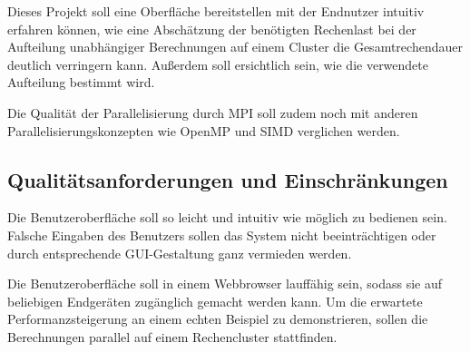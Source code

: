 Dieses Projekt soll eine Oberfläche bereitstellen mit der Endnutzer intuitiv erfahren können, wie
eine Abschätzung der benötigten Rechenlast bei der Aufteilung unabhängiger
Berechnungen auf einem Cluster die Gesamtrechendauer deutlich verringern kann.
Außerdem soll ersichtlich sein, wie die verwendete Aufteilung bestimmt wird.

Die Qualität der Parallelisierung durch MPI soll zudem noch mit anderen Parallelisierungskonzepten
wie OpenMP und SIMD verglichen werden.

\subsection{Qualitätsanforderungen und Einschränkungen}

Die Benutzeroberfläche soll so leicht und intuitiv wie möglich zu bedienen sein.
Falsche Eingaben des Benutzers sollen das System nicht beeinträchtigen oder durch entsprechende GUI-Gestaltung ganz vermieden werden.

Die Benutzeroberfläche soll in einem Webbrowser lauffähig sein, sodass sie auf beliebigen Endgeräten
zugänglich gemacht werden kann.
Um die erwartete Performanzsteigerung an einem echten Beispiel zu demonstrieren,
sollen die Berechnungen parallel auf einem Rechencluster stattfinden.






